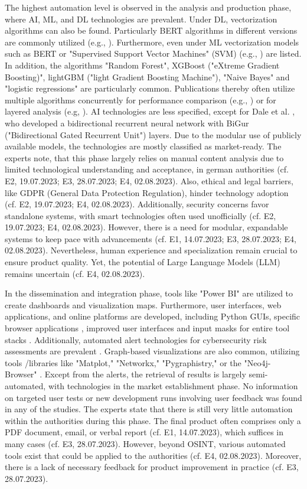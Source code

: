 \documentclass[10pt]{article}
\begin{document}
The highest automation level is observed in the analysis and production phase, where AI, ML, and DL technologies are prevalent.
Under DL, vectorization algorithms can also be found. Particularly BERT algorithms in different versions are commonly utilized
(e.g., \cite{Ma.2022}). Furthermore, even under ML vectorization models such as BERT or
"Supervised Support Vector Machines" (SVM) (e.g., \cite{Iorga.2020}) are listed.
In addition, the algorithms "Random Forest", XGBoost ("eXtreme Gradient Boosting)",
lightGBM ("light Gradient Boosting Machine"), "Naive Bayes" and "logistic regressions" are particularly common.
Publications thereby often utilize multiple algorithms concurrently for performance comparison (e.g., \cite{Tao.2023})
or for layered analysis (e.g, \cite{Yang.2022}). AI technologies are less specified,
except for Dale et al. \cite{Dale.2023}, who developed a bidirectional recurrent neural network with
BiGur ("Bidirectional Gated Recurrent Unit") layers. Due to the modular use of publicly available models,
the technologies are mostly classified as market-ready. The experts note, that this phase largely relies
on manual content analysis due to limited technological understanding and acceptance, in german authorities
(cf. E2, 19.07.2023; E3, 28.07.2023; E4, 02.08.2023). Also, ethical and legal barriers, like GDPR (General Data Protection Regulation), hinder technology
adoption (cf. E2, 19.07.2023; E4, 02.08.2023). Additionally, security concerns favor standalone systems,
with smart technologies often used unofficially (cf. E2, 19.07.2023; E4, 02.08.2023). However, there is a need for modular,
expandable systems to keep pace with advancements (cf. E1, 14.07.2023; E3, 28.07.2023; E4, 02.08.2023). Nevertheless, human experience
and specialization remain crucial to ensure product quality. Yet, the potential of Large Language Models (LLM) remains uncertain (cf. E4, 02.08.2023).

In the dissemination and integration phase, tools like "Power BI" \cite{Tao.2023}
are utilized to create dashboards and visualization maps. Furthermore, user interfaces,
web applications, and online platforms are developed, including Python GUIs,
specific browser applications \cite{Elmas.2022},
improved user interfaces and input masks for entire tool stacks \cite{Arjun.2020}.
Additionally, automated alert technologies for cybersecurity risk assessments are prevalent \cite{Ahuja.2022}. Graph-based visualizations are also common, utilizing tools
/libraries like "Matplot," "Networkx," "Pygraphistry," or the "Neo4j-Browser" \cite{Middleton.2020}.
Except from the alerts, the retrieval of results is largely semi-automated, with technologies in the market establishment phase. No information on targeted user tests or new development runs involving user feedback was found in any of the studies. The experts state that there is still very little
automation within the authorities during this phase. The final product often comprises only a PDF document, email, or verbal report (cf. E1, 14.07.2023), which suffices in many cases (cf. E3, 28.07.2023).
However, beyond OSINT, various automated tools exist that could be applied to the authorities (cf. E4, 02.08.2023). Moreover, there is a lack of necessary feedback for product improvement in practice (cf. E3, 28.07.2023).
\end{document}
